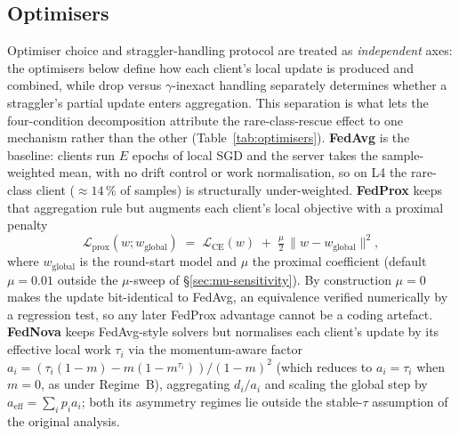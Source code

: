\documentclass[11pt,a4paper]{report}
\begin{document}
\subsection{Optimisers}
\label{sec:method-optimisers}

Optimiser choice and straggler-handling protocol are treated as \emph{independent}
axes: the optimisers below define how each client's local update is produced and
combined, while drop versus $\gamma$-inexact handling separately determines whether
a straggler's partial update enters aggregation. This separation is what lets the
four-condition decomposition attribute the rare-class-rescue effect to one
mechanism rather than the other (Table~\ref{tab:optimisers}). \textbf{FedAvg}
\citep{mcmahan2017fedavg} is the baseline: clients run $E$ epochs of local SGD and
the server takes the sample-weighted mean, with no drift control or work
normalisation, so on L4 the rare-class client ($\approx 14\,\%$ of samples) is
structurally under-weighted. \textbf{FedProx} \citep{li2020fedprox} keeps that
aggregation rule but augments each client's local objective with a proximal
penalty
\[
  \mathcal{L}_{\textrm{prox}}(w; w_{\textrm{global}})
  \;=\; \mathcal{L}_{\textrm{CE}}(w) \;+\; \tfrac{\mu}{2}\,
        \lVert w - w_{\textrm{global}} \rVert^{2},
\]
where $w_{\textrm{global}}$ is the round-start model and $\mu$ the proximal
coefficient (default $\mu = 0.01$ outside the $\mu$-sweep of
\S\ref{sec:mu-sensitivity}). By construction $\mu = 0$ makes the update
bit-identical to FedAvg, an equivalence verified numerically by a regression test,
so any later FedProx advantage cannot be a coding artefact. \textbf{FedNova}
\citep{wang2020fednova} keeps FedAvg-style solvers but normalises each client's
update by its effective local work $\tau_i$ via the momentum-aware factor
$a_i = (\tau_i(1-m) - m(1-m^{\tau_i}))/(1-m)^{2}$ (which reduces to $a_i = \tau_i$
when $m = 0$, as under Regime~B), aggregating $d_i / a_i$ and scaling the global
step by $a_{\textrm{eff}} = \sum_i p_i a_i$; both its asymmetry regimes lie outside
the stable-$\tau$ assumption of the original analysis.
\end{document}
